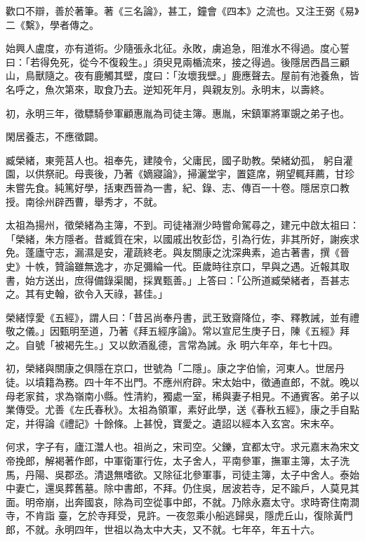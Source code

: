 \begin{pinyinscope}
 歡口不辯，善於著筆。著《三名論》，甚工，鐘會《四本》之流也。又注王弼《易》二《繫》，學者傳之。



 始興人盧度，亦有道術。少隨張永北征。永敗，虜追急，阻淮水不得過。度心誓曰：「若得免死，從今不復殺生。」須臾見兩楯流來，接之得過。後隱居西昌三顧山，鳥獸隨之。夜有鹿觸其壁，度曰：「汝壞我壁。」鹿應聲去。屋前有池養魚，皆名呼之，魚次第來，取食乃去。逆知死年月，與親友別。永明末，以壽終。



 初，永明三年，徵驃騎參軍顧惠胤為司徒主簿。惠胤，宋鎮軍將軍覬之弟子也。



 閑居養志，不應徵闢。



 臧榮緒，東莞莒人也。祖奉先，建陵令，父庸民，國子助教。榮緒幼孤，
 躬自灌園，以供祭祀。母喪後，乃著《嫡寢論》，掃灑堂宇，置筵席，朔望輒拜薦，甘珍未嘗先食。純篤好學，括東西晉為一書，紀、錄、志、傳百一十卷。隱居京口教授。南徐州辟西曹，舉秀才，不就。



 太祖為揚州，徵榮緒為主簿，不到。司徒褚淵少時嘗命駕尋之，建元中啟太祖曰：「榮緒，朱方隱者。昔臧質在宋，以國戚出牧彭岱，引為行佐，非其所好，謝疾求免。蓬廬守志，漏濕是安，灌蔬終老。與友關康之沈深典素，追古著書，撰《晉史》十帙，贊論雖無逸才，亦足彌綸一代。臣歲時往京口，早與之遇。近報其取書，始方送出，庶得備錄渠閣，採異甄善。」上答曰：「公所道臧榮緒者，吾甚志之。其有史翰，欲令入天祿，甚佳。」



 榮緒惇愛《五經》，謂人曰：「昔呂尚奉丹書，武王致齋降位，李、釋教誡，並有禮敬之儀。」因甄明至道，乃著《拜五經序論》。常以宣尼生庚子日，陳《五經》拜之。自號「被褐先生。」又以飲酒亂德，言常為誡。永
 明六年卒，年七十四。



 初，榮緒與關康之俱隱在京口，世號為「二隱」。康之字伯愉，河東人。世居丹徒。以墳籍為務。四十年不出門。不應州府辟。宋太始中，徵通直郎，不就。晚以母老家貧，求為嶺南小縣。性清約，獨處一室，稀與妻子相見。不通賓客。弟子以業傳受。尤善《左氏春秋》。太祖為領軍，素好此學，送《春秋五經》，康之手自點定，并得論《禮記》十餘條。上甚悅，寶愛之。遺詔以經本入玄宮。宋末卒。



 何求，字子有，廬江灊人也。祖尚之，宋司空。父鑠，宜都太守。求元嘉末為宋文帝挽郎，解褐著作郎，中軍衛軍行佐，太子舍人，平南參軍，撫軍主簿，太子洗馬，丹陽、吳郡丞。清退無嗜欲。又除征北參軍事，司徒主簿，太子中舍人。泰始中妻亡，還吳葬舊墓。除中書郎，不拜。仍住吳，居波若寺，足不踰戶，人莫見其面。明帝崩，出奔國哀，除為司空從事中郎，不就。乃除永嘉太守。求時寄住南澗寺，不肯詣
 臺，乞於寺拜受，見許。一夜忽乘小船逃歸吳，隱虎丘山，復除黃門郎，不就。永明四年，世祖以為太中大夫，又不就。七年卒，年五十六。




\end{pinyinscope}
